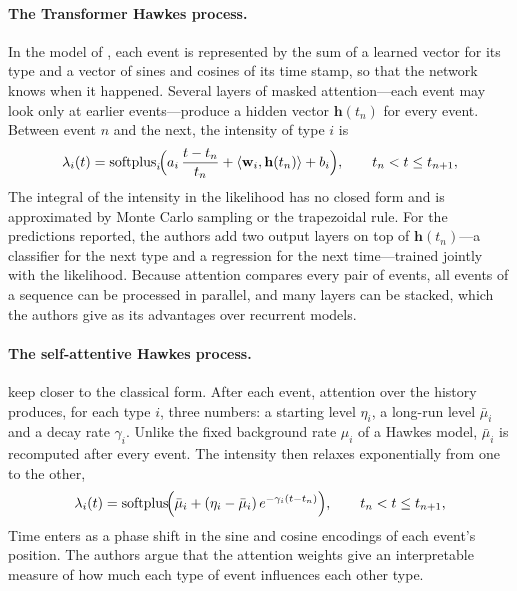 \paragraph{The Transformer Hawkes process.} In the model of \citet{zuo2020thp}, each event is represented by the sum
of a learned vector for its type and a vector of sines and cosines of its time stamp, so that the network knows when
it happened. Several layers of masked attention---each event may look only at earlier events---produce a hidden
vector $\mathbf{h}(t_n)$ for every event. Between event $n$ and the next, the intensity of type $i$ is
\begin{equation}
\lambda_i(t) = \operatorname{softplus}_i\!\Bigl(a_i\,\frac{t - t_n}{t_n} + \langle \mathbf{w}_i, \mathbf{h}(t_n)\rangle + b_i\Bigr),
\qquad t_n < t \le t_{n+1},
\label{eq:thp}
\end{equation}
The integral of the intensity in the likelihood has no closed form and is approximated by Monte Carlo sampling or
the trapezoidal rule. For the predictions reported, the authors add two output layers on top of
$\mathbf{h}(t_n)$---a classifier for the next type and a regression for the next time---trained jointly with the
likelihood. Because attention compares every pair of events, all events of a sequence can be processed in
parallel, and many layers can be stacked, which the authors give as its advantages over recurrent models.

\paragraph{The self-attentive Hawkes process.} \citet{zhang2020sahp} keep closer to the classical form. After each
event, attention over the history produces, for each type $i$, three numbers: a starting level $\eta_i$, a
long-run level $\bar\mu_i$ and a decay rate $\gamma_i$. Unlike the fixed background rate $\mu_i$ of a Hawkes
model, $\bar\mu_i$ is recomputed after every event. The intensity then relaxes exponentially from one to the other,
\begin{equation}
\lambda_i(t) = \operatorname{softplus}\!\Bigl(\bar\mu_i + (\eta_i - \bar\mu_i)\, e^{-\gamma_i (t - t_n)}\Bigr),
\qquad t_n < t \le t_{n+1},
\label{eq:sahp}
\end{equation}
Time enters as a phase shift in the sine and cosine encodings of each event's position. The authors argue that the
attention weights give an interpretable measure of how much each type of event influences each other type.

